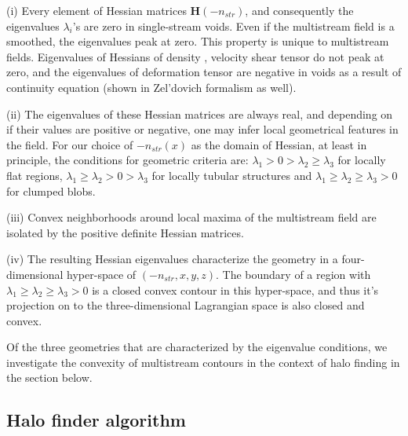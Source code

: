 (i) Every element of Hessian matrices $\mathbf{H}(-n_{str})$, and consequently the eigenvalues $\lambda_i$'s are zero in single-stream voids. Even if the multistream field is a smoothed, the eigenvalues peak at zero. This property is unique to multistream fields. Eigenvalues of Hessians of density \cite{Aragon-Calvo2007}, velocity shear tensor \cite{Libeskind2013} do not peak at zero, and the eigenvalues of deformation tensor are negative in voids as a result of continuity equation (shown in Zel'dovich formalism as well).

(ii) The eigenvalues of these Hessian matrices are always real, and depending on if their values are positive or negative, one may infer local geometrical features in the field. For our choice of $-n_{str}(x)$ as the domain of Hessian, at least in principle, the conditions for geometric criteria are: $\lambda_1 > 0 > \lambda_2 \geq \lambda_3$ for locally flat regions, $\lambda_1 \geq \lambda_2 > 0 > \lambda_3$ for locally tubular structures and $\lambda_1 \geq \lambda_2 \geq \lambda_3 > 0$ for clumped blobs. 

(iii) Convex neighborhoods around local maxima of the multistream field are isolated by the positive definite Hessian matrices. 

(iv) The resulting Hessian eigenvalues characterize the geometry in a four-dimensional
hyper-space of $(-n_{str}, x, y, z)$. The boundary of a region with $\lambda_1 \geq \lambda_2 \geq \lambda_3 > 0$ is a closed convex contour in this hyper-space, and thus it’s projection on to the three-dimensional Lagrangian space is also closed and convex.

Of the three geometries that are characterized by the eigenvalue conditions, we investigate the convexity of multistream contours in the context of halo finding in the section below.


\subsection{Halo finder algorithm}
\label{subsec:technique}



